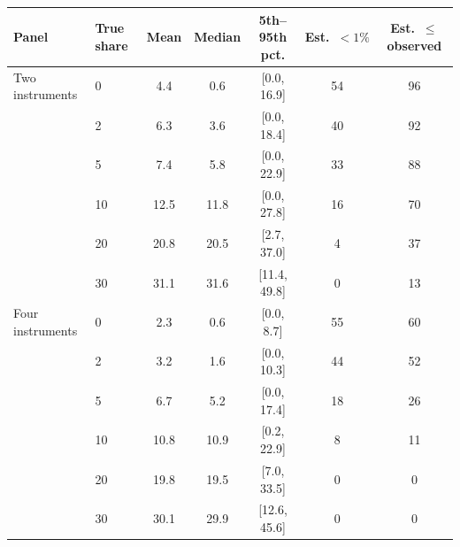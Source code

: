 \begin{tabular}{llccccc}
\toprule
Panel & True share & Mean & Median & 5th--95th pct. & Est.\ $<1\%$ & Est.\ $\le$ observed \\
\midrule
Two instruments & 0 & 4.4 & 0.6 & [0.0, 16.9] & 54 & 96 \\
 & 2 & 6.3 & 3.6 & [0.0, 18.4] & 40 & 92 \\
 & 5 & 7.4 & 5.8 & [0.0, 22.9] & 33 & 88 \\
 & 10 & 12.5 & 11.8 & [0.0, 27.8] & 16 & 70 \\
 & 20 & 20.8 & 20.5 & [2.7, 37.0] & 4 & 37 \\
 & 30 & 31.1 & 31.6 & [11.4, 49.8] & 0 & 13 \\
\addlinespace
Four instruments & 0 & 2.3 & 0.6 & [0.0, 8.7] & 55 & 60 \\
 & 2 & 3.2 & 1.6 & [0.0, 10.3] & 44 & 52 \\
 & 5 & 6.7 & 5.2 & [0.0, 17.4] & 18 & 26 \\
 & 10 & 10.8 & 10.9 & [0.2, 22.9] & 8 & 11 \\
 & 20 & 19.8 & 19.5 & [7.0, 33.5] & 0 & 0 \\
 & 30 & 30.1 & 29.9 & [12.6, 45.6] & 0 & 0 \\
\bottomrule
\end{tabular}
